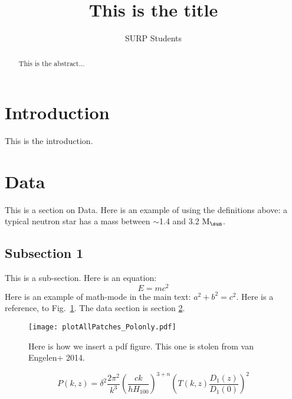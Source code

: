 \documentclass[apj]{emulateapj}
\newcommand{\Msol}{${\rm M_{\sun}}$}
\begin{document}
\title{This is the title}
 
\author{SURP Students}
 
\begin{abstract}
This is the abstract...
\end{abstract}





\section{Introduction}
\label{sec:intro}

This is the introduction.


\section{Data}
\label{sec:data}
This is a section on Data. 
Here is an example of using the definitions above: a typical neutron star has a mass between $\sim$1.4 and 3.2 \Msol.


\subsection{Subsection 1}
\label{sec:cmb_data}
This is a sub-section.
Here is an equation:
\begin{equation}
E = mc^2
\label{eq:relativity}
\end{equation}
Here is an example of math-mode in the main text: $a^2 + b^2 = c^2$.  Here is a reference, to Fig.~\ref{fig:figureOfSpectrum}.  The data section is section \ref{sec:data}.


\begin{figure}
\texttt{[image: plotAllPatches\_Polonly.pdf]}
\caption{Here is how we insert a pdf figure.  This one is stolen from van Engelen+ 2014.\vspace{3mm}}
\label{fig:figureOfSpectrum}
\end{figure}

\begin{equation}
P(k,z) = \delta^2 \frac{2 \pi^2}{k^3} \left(\frac{c k}{h
H_{100}}\right)^{3+n} \left(T(k,z) \frac{D_1(z)}{D_1(0)}\right)^2
\end{equation}
\end{document}
